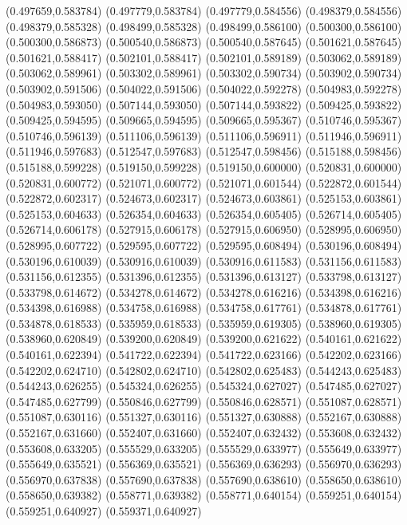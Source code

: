 (0.497659,0.583784)
(0.497779,0.583784)
(0.497779,0.584556)
(0.498379,0.584556)
(0.498379,0.585328)
(0.498499,0.585328)
(0.498499,0.586100)
(0.500300,0.586100)
(0.500300,0.586873)
(0.500540,0.586873)
(0.500540,0.587645)
(0.501621,0.587645)
(0.501621,0.588417)
(0.502101,0.588417)
(0.502101,0.589189)
(0.503062,0.589189)
(0.503062,0.589961)
(0.503302,0.589961)
(0.503302,0.590734)
(0.503902,0.590734)
(0.503902,0.591506)
(0.504022,0.591506)
(0.504022,0.592278)
(0.504983,0.592278)
(0.504983,0.593050)
(0.507144,0.593050)
(0.507144,0.593822)
(0.509425,0.593822)
(0.509425,0.594595)
(0.509665,0.594595)
(0.509665,0.595367)
(0.510746,0.595367)
(0.510746,0.596139)
(0.511106,0.596139)
(0.511106,0.596911)
(0.511946,0.596911)
(0.511946,0.597683)
(0.512547,0.597683)
(0.512547,0.598456)
(0.515188,0.598456)
(0.515188,0.599228)
(0.519150,0.599228)
(0.519150,0.600000)
(0.520831,0.600000)
(0.520831,0.600772)
(0.521071,0.600772)
(0.521071,0.601544)
(0.522872,0.601544)
(0.522872,0.602317)
(0.524673,0.602317)
(0.524673,0.603861)
(0.525153,0.603861)
(0.525153,0.604633)
(0.526354,0.604633)
(0.526354,0.605405)
(0.526714,0.605405)
(0.526714,0.606178)
(0.527915,0.606178)
(0.527915,0.606950)
(0.528995,0.606950)
(0.528995,0.607722)
(0.529595,0.607722)
(0.529595,0.608494)
(0.530196,0.608494)
(0.530196,0.610039)
(0.530916,0.610039)
(0.530916,0.611583)
(0.531156,0.611583)
(0.531156,0.612355)
(0.531396,0.612355)
(0.531396,0.613127)
(0.533798,0.613127)
(0.533798,0.614672)
(0.534278,0.614672)
(0.534278,0.616216)
(0.534398,0.616216)
(0.534398,0.616988)
(0.534758,0.616988)
(0.534758,0.617761)
(0.534878,0.617761)
(0.534878,0.618533)
(0.535959,0.618533)
(0.535959,0.619305)
(0.538960,0.619305)
(0.538960,0.620849)
(0.539200,0.620849)
(0.539200,0.621622)
(0.540161,0.621622)
(0.540161,0.622394)
(0.541722,0.622394)
(0.541722,0.623166)
(0.542202,0.623166)
(0.542202,0.624710)
(0.542802,0.624710)
(0.542802,0.625483)
(0.544243,0.625483)
(0.544243,0.626255)
(0.545324,0.626255)
(0.545324,0.627027)
(0.547485,0.627027)
(0.547485,0.627799)
(0.550846,0.627799)
(0.550846,0.628571)
(0.551087,0.628571)
(0.551087,0.630116)
(0.551327,0.630116)
(0.551327,0.630888)
(0.552167,0.630888)
(0.552167,0.631660)
(0.552407,0.631660)
(0.552407,0.632432)
(0.553608,0.632432)
(0.553608,0.633205)
(0.555529,0.633205)
(0.555529,0.633977)
(0.555649,0.633977)
(0.555649,0.635521)
(0.556369,0.635521)
(0.556369,0.636293)
(0.556970,0.636293)
(0.556970,0.637838)
(0.557690,0.637838)
(0.557690,0.638610)
(0.558650,0.638610)
(0.558650,0.639382)
(0.558771,0.639382)
(0.558771,0.640154)
(0.559251,0.640154)
(0.559251,0.640927)
(0.559371,0.640927)
